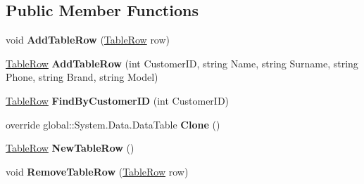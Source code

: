 \subsection*{Public Member Functions}
\begin{DoxyCompactItemize}
\item 
\mbox{\label{classprojekt__grupowy_1_1database_data_set1_1_1_table_data_table_a0e87c5d4fcafd15147cc3aad2a698ee0}} 
void {\bfseries Add\+Table\+Row} (\hyperlink{classprojekt__grupowy_1_1database_data_set1_1_1_table_row}{Table\+Row} row)
\item 
\mbox{\label{classprojekt__grupowy_1_1database_data_set1_1_1_table_data_table_af8c7d84b49f2931cf4b7e0b358ba4873}} 
\hyperlink{classprojekt__grupowy_1_1database_data_set1_1_1_table_row}{Table\+Row} {\bfseries Add\+Table\+Row} (int Customer\+ID, string Name, string Surname, string Phone, string Brand, string Model)
\item 
\mbox{\label{classprojekt__grupowy_1_1database_data_set1_1_1_table_data_table_a128b88e58a07b07514cea04f3d91868f}} 
\hyperlink{classprojekt__grupowy_1_1database_data_set1_1_1_table_row}{Table\+Row} {\bfseries Find\+By\+Customer\+ID} (int Customer\+ID)
\item 
\mbox{\label{classprojekt__grupowy_1_1database_data_set1_1_1_table_data_table_aa01dfb0c435bd44ae82576752ff0f345}} 
override global\+::\+System.\+Data.\+Data\+Table {\bfseries Clone} ()
\item 
\mbox{\label{classprojekt__grupowy_1_1database_data_set1_1_1_table_data_table_a8632009bcffc0627a171fe37ada98295}} 
\hyperlink{classprojekt__grupowy_1_1database_data_set1_1_1_table_row}{Table\+Row} {\bfseries New\+Table\+Row} ()
\item 
\mbox{\label{classprojekt__grupowy_1_1database_data_set1_1_1_table_data_table_a6ab3f3c4ad4b6d5809a88ef8f24eb29a}} 
void {\bfseries Remove\+Table\+Row} (\hyperlink{classprojekt__grupowy_1_1database_data_set1_1_1_table_row}{Table\+Row} row)
\end{DoxyCompactItemize}
